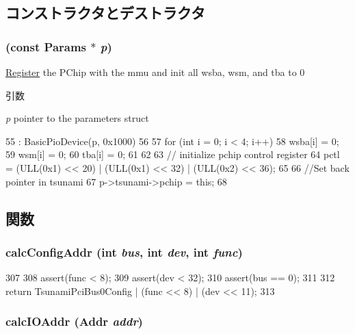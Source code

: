 \subsection{コンストラクタとデストラクタ}
\hypertarget{classTsunamiPChip_a2b23bec87373536aec1deca8d2646a87}{
\subsubsection[{TsunamiPChip}]{ (const {\bf Params} $\ast$ {\em p})}}
\label{classTsunamiPChip_a2b23bec87373536aec1deca8d2646a87}
\hyperlink{classRegister}{Register} the PChip with the mmu and init all wsba, wsm, and tba to 0 
\begin{DoxyParams}{引数}
\item[{\em p}]pointer to the parameters struct \end{DoxyParams}



\begin{DoxyCode}
55     : BasicPioDevice(p, 0x1000)
56 {
57     for (int i = 0; i < 4; i++) {
58         wsba[i] = 0;
59         wsm[i] = 0;
60         tba[i] = 0;
61     }
62 
63     // initialize pchip control register
64     pctl = (ULL(0x1) << 20) | (ULL(0x1) << 32) | (ULL(0x2) << 36);
65 
66     //Set back pointer in tsunami
67     p->tsunami->pchip = this;
68 }
\end{DoxyCode}


\subsection{関数}
\hypertarget{classTsunamiPChip_ac58937201c28a74230a03b39b03066b6}{
\subsubsection[{calcConfigAddr}]{ calcConfigAddr (int {\em bus}, \/  int {\em dev}, \/  int {\em func})}}
\label{classTsunamiPChip_ac58937201c28a74230a03b39b03066b6}



\begin{DoxyCode}
307 {
308     assert(func < 8);
309     assert(dev < 32);
310     assert(bus == 0);
311 
312     return TsunamiPciBus0Config | (func << 8) | (dev << 11);
313 }
\end{DoxyCode}
\hypertarget{classTsunamiPChip_a6c236382792e59da5c56c9d7c01de500}{
\subsubsection[{calcIOAddr}]{ calcIOAddr ({\bf Addr} {\em addr})}}
\label{classTsunamiPChip_a6c236382792e59da5c56c9d7c01de500}



